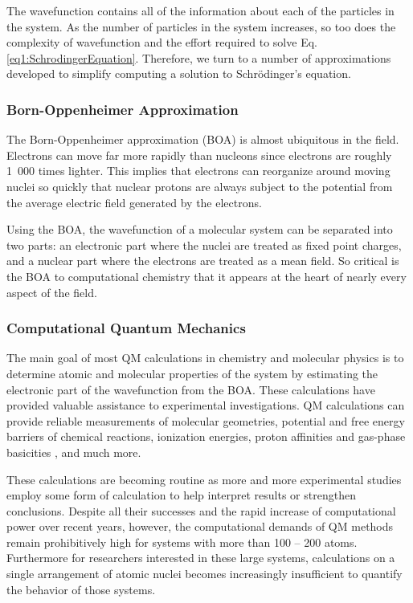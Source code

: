 The wavefunction contains all of the information about each of the particles in
the system. As the number of particles in the system increases, so too does the
complexity of wavefunction and the effort required to solve Eq.
\ref{eq1:SchrodingerEquation}. Therefore, we turn to a number of approximations
developed to simplify computing a solution to Schr\"odinger's equation.

\subsubsection{Born-Oppenheimer Approximation}

The Born-Oppenheimer approximation (BOA) is almost ubiquitous in the field.
Electrons can move far more rapidly than nucleons since electrons are roughly
\mbox{1 000} times lighter. This implies that electrons can reorganize around
moving nuclei so quickly that nuclear protons are always subject to the
potential from the average electric field generated by the electrons.

Using the BOA, the wavefunction of a molecular system can be separated into two
parts: an electronic part where the nuclei are treated as fixed point charges,
and a nuclear part where the electrons are treated as a mean field.
\cite{McQuarrie_Book_PhysChem_1997} So critical is the BOA to computational
chemistry that it appears at the heart of nearly every aspect of the field.

\subsubsection{Computational Quantum Mechanics}
\label{sec1:CompQuantumMech}

The main goal of most QM calculations in chemistry and molecular physics is to
determine atomic and molecular properties of the system by estimating the
electronic part of the wavefunction from the BOA. These calculations have
provided valuable assistance to experimental investigations. QM calculations
can provide reliable measurements of molecular geometries,
\cite{Jeletic_JOrganometChem_2011_v696_p3127} potential and free energy barriers
of chemical reactions, \cite{Chandrasekhar_JAmChemSoc_1985_v107_p154} ionization
energies, \cite{Watson_ChemPhysLett_2013_v555_p235} proton affinities and
gas-phase basicities \cite{Range_PhysChemChemPhys_2005_v7_p3070}, and much more.
\cite{Hehre_Ab_initio_MO_Theory_Book_1986}

These calculations are becoming routine as more and more experimental studies
employ some form of calculation to help interpret results or strengthen
conclusions. Despite all their successes and the rapid increase of computational
power over recent years, however, the computational demands of QM methods remain
prohibitively high for systems with more than 100 -- 200 atoms. Furthermore for
researchers interested in these large systems, calculations on a single
arrangement of atomic nuclei becomes increasingly insufficient to quantify the
behavior of those systems.


